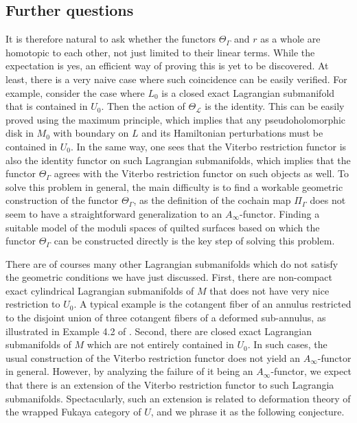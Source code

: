 \documentclass{amsart}
\numberwithin{equation}{section}
\numberwithin{figure}{section}
\begin{document}
\subsection{Further questions}
	It is therefore natural to ask whether the functors $\Theta_{\Gamma}$ and $r$ as a whole are homotopic to each other, not just limited to their linear terms. While the expectation is yes, an efficient way of proving this is yet to be discovered. At least, there is a very naive case where such coincidence can be easily verified. For example, consider the case where $L_{0}$ is a closed exact Lagrangian submanifold that is contained in $U_{0}$. Then the action of $\Theta_{\mathcal{L}}$ is the identity. This can be easily proved using the maximum principle, which implies that any pseudoholomorphic disk in $M_{0}$ with boundary on $L$ and its Hamiltonian perturbations must be contained in $U_{0}$. In the same way, one sees that the Viterbo restriction functor is also the identity functor on such Lagrangian submanifolds, which implies that the functor $\Theta_{\Gamma}$ agrees with the Viterbo restriction functor on such objects as well. To solve this problem in general, the main difficulty is to find a workable geometric construction of the functor $\Theta_{\Gamma}$, as the definition of the cochain map $\Pi_{\Gamma}$ does not seem to have a straightforward generalization to an $A_{\infty}$-functor. Finding a suitable model of the moduli spaces of quilted surfaces based on which the functor $\Theta_{\Gamma}$ can be constructed directly is the key step of solving this problem. \par
	
	There are of courses many other Lagrangian submanifolds which do not satisfy the geometric conditions we have just discussed. First, there are non-compact exact cylindrical Lagrangian submanifolds of $M$ that does not have very nice restriction to $U_{0}$. A typical example is the cotangent fiber of an annulus restricted to the disjoint union of three cotangent fibers of a deformed sub-annulus, as illustrated in Example 4.2 of \cite{Abouzaid-Seidel}. Second, there are closed exact Lagrangian submanifolds of $M$ which are not entirely contained in $U_{0}$. In such cases, the usual construction of the Viterbo restriction functor does not yield an $A_{\infty}$-functor in general.
However, by analyzing the failure of it being an $A_{\infty}$-functor, we expect that there is an extension of the Viterbo restriction functor to such Lagrangia submanifolds.
Spectacularly, such an extension is related to deformation theory of the wrapped Fukaya category of $U$, and we phrase it as the following conjecture. \par
\end{document}
